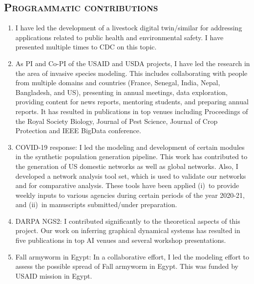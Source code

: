 \documentclass[margin,10pt]{res}
\begin{document}
\begin{resume}
\section{\textnormal{\textsc{Programmatic contributions}}}
\begin{enumerate}[$\circ$]
\item I have led the development of a livestock digital twin/similar for
addressing applications related to public health and environmental safety. 
I have presented multiple times to CDC on this topic.
\item As PI and Co-PI of the USAID and USDA projects, I have led the
research in the area of invasive species modeling. This includes
collaborating with people from multiple domains and countries (France,
Senegal, India, Nepal, Bangladesh, and US), presenting in annual meetings,
data exploration, providing content for news reports, mentoring students,
and preparing annual reports. It has resulted in publications in top venues
including Proceedings of the Royal Society Biology, Journal of Pest
Science, Journal of Crop Protection and IEEE BigData conference.
\item COVID-19 response: I led the modeling and development of certain
modules in the synthetic population generation pipeline. This work has
contributed to the generation of US domestic networks as well as global
networks. Also, I developed a network analysis tool set, which is used to
validate our networks and for comparative analysis. These tools have been
applied (i)~to provide weekly inputs to various agencies during certain
periods of the year 2020-21, and (ii)~in manuscripts submitted/under
preparation.
\item DARPA NGS2: I contributed significantly to the theoretical aspects of
this project. Our work on inferring graphical dynamical systems has
resulted in five publications in top AI venues and several workshop
presentations.
\item Fall armyworm in Egypt: In a collaborative effort, I led the modeling
effort to assess the possible spread of Fall armyworm in Egypt. This was
funded by USAID mission in Egypt.
\end{enumerate}


\end{resume}
\end{document}
